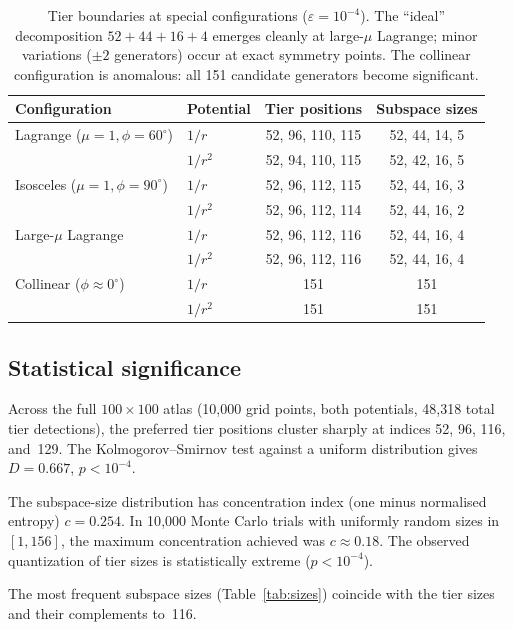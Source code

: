 \documentclass[11pt,a4paper]{article}
\theoremstyle{remark}
\begin{document}
\begin{table}[ht]
\centering
\small
\begin{tabular}{@{}llcc@{}}
\toprule
Configuration & Potential & Tier positions & Subspace sizes \\
\midrule
Lagrange ($\mu{=}1, \phi{=}60^\circ$)
  & $1/r$   & 52, 96, 110, 115 & 52, 44, 14, 5 \\
  & $1/r^2$ & 52, 94, 110, 115 & 52, 42, 16, 5 \\[3pt]
Isosceles ($\mu{=}1, \phi{=}90^\circ$)
  & $1/r$   & 52, 96, 112, 115 & 52, 44, 16, 3 \\
  & $1/r^2$ & 52, 96, 112, 114 & 52, 44, 16, 2 \\[3pt]
Large-$\mu$ Lagrange
  & $1/r$   & 52, 96, 112, 116 & 52, 44, 16, 4 \\
  & $1/r^2$ & 52, 96, 112, 116 & 52, 44, 16, 4 \\[3pt]
Collinear ($\phi \approx 0^\circ$)
  & $1/r$   & 151 & 151 \\
  & $1/r^2$ & 151 & 151 \\
\bottomrule
\end{tabular}
\caption{Tier boundaries at special configurations
  ($\varepsilon = 10^{-4}$).  The ``ideal'' decomposition
  $52 + 44 + 16 + 4$ emerges cleanly at large-$\mu$
  Lagrange; minor variations ($\pm 2$ generators) occur
  at exact symmetry points.  The collinear configuration
  is anomalous: all 151 candidate generators become
  significant.}
\label{tab:tier-configs}
\end{table}

\subsection{Statistical significance}

Across the full $100 \times 100$ atlas (10{,}000 grid
points, both potentials, 48{,}318 total tier detections),
the preferred tier positions cluster sharply at indices
52, 96, 116, and~129.  The Kolmogorov--Smirnov test
against a uniform distribution gives $D = 0.667$,
$p < 10^{-4}$.

The subspace-size distribution has concentration index
(one minus normalised entropy) $c = 0.254$.  In
10{,}000 Monte Carlo trials with uniformly random sizes
in $[1, 156]$, the maximum concentration achieved was
$c \approx 0.18$.  The observed quantization of tier
sizes is statistically extreme ($p < 10^{-4}$).

The most frequent subspace sizes (Table~\ref{tab:sizes})
coincide with the tier sizes and their complements to~116.
\end{document}
